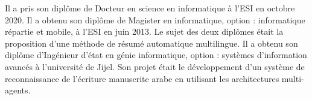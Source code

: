 \documentclass{KBook}
\begin{document}
\begin{tcolorbox}[colback=my-grey,
	colframe=my-grey,  
	center, arc=0pt,outer arc=0pt,
	valign=top, 
	halign=flush left,
	width=\textwidth]
\begin{minipage}[t]{0.80\textwidth}
		Il a pris son diplôme de Docteur en science en informatique à l'ESI en octobre 2020.
		Il a obtenu son diplôme de Magister en informatique, option : informatique répartie et mobile, à l'ESI en juin 2013.
		Le sujet des deux diplômes était la proposition d'une méthode de résumé automatique multilingue.
		Il a obtenu son diplôme d'Ingénieur d'état en génie informatique, option : systèmes d'information avancés à l'université de Jijel.
		Son projet était le développement d'un système de reconnaissance de l'écriture manuscrite arabe en utilisant les architectures multi-agents.
		
	\end{minipage}
	
	
\end{tcolorbox}
\end{document}
